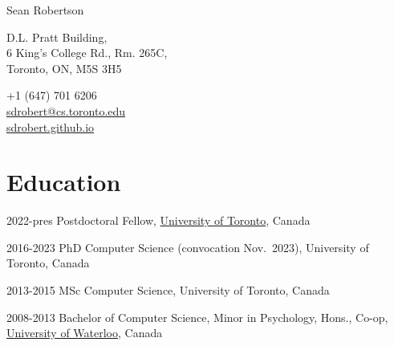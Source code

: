 \documentclass{article}
\begin{document}
\thispagestyle{empty}

\begin{center}
  \huge{Sean Robertson}
\end{center}
\vspace{\baselineskip}

\begin{center}
  \begin{minipage}{0.5\textwidth}
  \begin{flushleft}
    D.L. Pratt Building, \\
    6 King's College Rd., Rm. 265C, \\
    Toronto, ON, M5S 3H5
  \end{flushleft}
  \end{minipage}
  \hfill
  \begin{minipage}{0.4\textwidth}
  \begin{flushright}
    +1 (647) 701 6206 \\
    \href{mailto:sdrobert@cs.toronto.edu}{sdrobert@cs.toronto.edu} \\
    \href{https://sdrobert.github.io}{sdrobert.github.io}
  \end{flushright}
  \end{minipage}
\end{center}

\section{Education}
\begin{CV}
  \item[2022-pres] Postdoctoral Fellow,
    \href{https://www.utoronto.ca/}{University of Toronto}, Canada

  \item[2016-2023] PhD Computer Science (convocation Nov.~2023),
    University of Toronto, Canada
    
  \item[2013-2015] MSc Computer Science, University of Toronto, Canada

  \item[2008-2013] Bachelor of Computer Science, Minor in Psychology, Hons.,
    Co-op, \href{https://uwaterloo.ca/}{University of Waterloo}, Canada
\end{CV}
\end{document}
